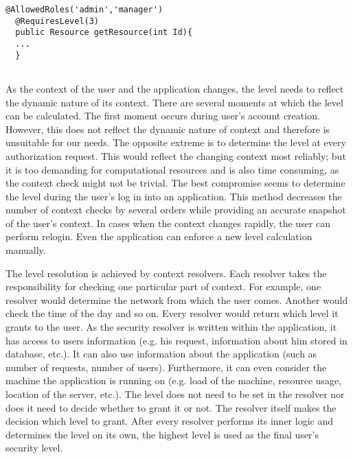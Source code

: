 \documentclass{sig-alternate}
\begin{document}


 
\begin{lstlisting}[]
  @AllowedRoles('admin','manager')
  @RequiresLevel(3)
  public Resource getResource(int Id){
  ...
  }
                
\end{lstlisting}

As the context of the user and the application changes, the level needs to reflect the dynamic nature of its context. There are several moments at which the level can be calculated. The first moment occurs during user's account creation. However, this does not reflect the dynamic nature of context and therefore is unsuitable for our needs. The opposite extreme is to determine the level at every authorization request. This would reflect the changing context most reliably; but it is too demanding for computational resources and is also time consuming, as the context check might not be trivial. The best compromise seems to determine the level during the user's log in into an application. This method decreases the number of context checks by several orders while providing an accurate snapshot of the user's context. In cases when the context changes rapidly, the user can perform relogin. Even the application can enforce a new level calculation manually.

The level resolution is achieved by context resolvers. Each resolver takes the responsibility for checking one particular part of context. For example, one resolver would determine the network from which the user comes. Another would check the time of the day and so on. Every resolver would return which level it grants to the user. As the security resolver is written within the application, it has access to users information (e.g. his request, information about him stored in database, etc.). It can also use information about the application (such as number of requests, number of users). Furthermore, it can even consider the machine the application is running on (e.g. load of the machine, resource usage, location of the server, etc.). The level does not need to be set in the resolver nor does it need to decide whether to grant it or not. The resolver itself makes the decision which level to grant. After every resolver performs its inner logic and determines the level on its own, the highest level is used as the final user's security level.
\end{document}
